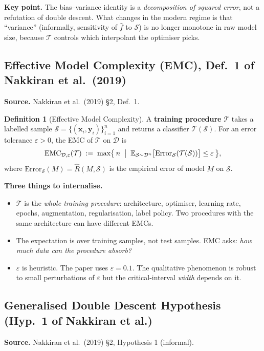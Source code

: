 \documentclass[11pt,a4paper]{article}
\newcommand{\kw}[1]{\textcolor{uompurple}{\textbf{#1}}}
\newcommand{\E}{\mathbb{E}}
\newcommand{\T}{\mathcal{T}}
\newcommand{\D}{\mathcal{D}}
\newcommand{\Sset}{\mathcal{S}}
\theoremstyle{definition}
\newtheorem{defn}{Definition}
\begin{document}
\noindent\textbf{Key point.} The bias--variance identity is a \emph{decomposition of squared error}, not a refutation of double descent. What changes in the modern regime is that ``variance'' (informally, sensitivity of $\hat f$ to $\Sset$) is no longer monotone in raw model size, because $\T$ controls which interpolant the optimiser picks.

\subsection{Effective Model Complexity (EMC), Def.~1 of Nakkiran et al.~(2019)}

\noindent\textbf{Source.} Nakkiran et al.\ (2019) \S2, Def.~1.

\begin{defn}[Effective Model Complexity]
A \kw{training procedure} $\T$ takes a labelled sample $\Sset = \{(\bm{x}_i,\bm{y}_i)\}_{i=1}^n$ and returns a classifier $\T(\Sset)$. For an error tolerance $\varepsilon>0$, the EMC of $\T$ on $\D$ is
\[
\mathrm{EMC}_{\D,\varepsilon}(\T) \;:=\; \max\bigl\{\,n\;\bigm|\;\E_{\Sset\sim\D^{n}}\bigl[\mathrm{Error}_{\Sset}(\T(\Sset))\bigr]\le\varepsilon\,\bigr\},
\]
where $\mathrm{Error}_{\Sset}(M) = \widehat R(M, \Sset)$ is the empirical error of model $M$ on $\Sset$.
\end{defn}

\noindent\textbf{Three things to internalise.}
\begin{itemize}
\item $\T$ is the \emph{whole training procedure}: architecture, optimiser, learning rate, epochs, augmentation, regularisation, label policy. Two procedures with the same architecture can have different EMCs.
\item The expectation is over training samples, not test samples. EMC asks: \emph{how much data can the procedure absorb?}
\item $\varepsilon$ is heuristic. The paper uses $\varepsilon = 0.1$. The qualitative phenomenon is robust to small perturbations of $\varepsilon$ but the critical-interval \emph{width} depends on it.
\end{itemize}

\subsection{Generalised Double Descent Hypothesis (Hyp.~1 of Nakkiran et al.)}

\noindent\textbf{Source.} Nakkiran et al.\ (2019) \S2, Hypothesis 1 (informal).
\end{document}
